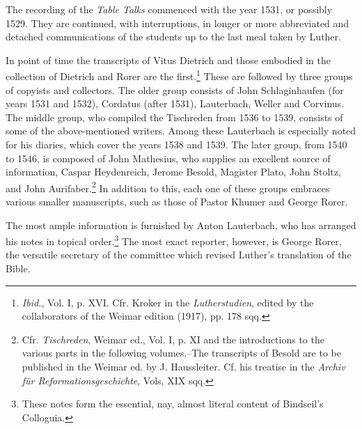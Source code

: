 The recording of the \textit{Table Talks} commenced with the year 1531,
or possibly 1529. They are continued, with interruptions, in longer or
more abbreviated and detached communications of the students up to
the last meal taken by Luther.

In point of time the transcripts of Vitus Dietrich and those embodied in
the collection of Dietrich and Rorer are the first.\footnote
{\textit{Ibid.}, Vol. I, p. XVI. Cfr. Kroker in the \textit{Lutherstudien}, edited by the collaborators of
the Weimar edition (1917), pp. 178 sqq.}
These are followed by
three groups of copyists and collectors. The older group consists of John
Schlaginhaufen (for years 1531 and 1532), Cordatus (after 1531), Lauterbach,
Weller and Corvinus. The middle group, who compiled the Tischreden
from 1536 to 1539, consists of some of the above-mentioned writers. Among
these Lauterbach is especially noted for his diaries, which cover the years
1538 and 1539. The later group, from 1540 to 1546, is composed of John
Mathesius, who supplies an excellent source of information, Caspar Heydenreich,
Jerome Besold, Magister Plato, John Stoltz, and John Aurifaber.\footnote
{Cfr. \textit{Tischreden}, Weimar ed., Vol. I, p. XI and the introductions to the various parts in
the following volumes.--The transcripts of Besold are to be published in the Weimar ed.
by J. Haussleiter. Cf. his treatise in the \textit{Archiv für Reformationsgeschichte}, Vols, XIX sqq.}
In addition to this, each one of these groups embraces various smaller manuscripts,
such as those of Pastor Khumer and George Rorer.

The most ample information is furnished by Anton Lauterbach, who has
arranged his notes in topical order.\footnote{These notes form the essential, nay, almost literal content of Bindseil’s Colloguia.}
 The most exact reporter, however, is
George Rorer, the versatile secretary of the committee which revised Luther’s
translation of the Bible.

